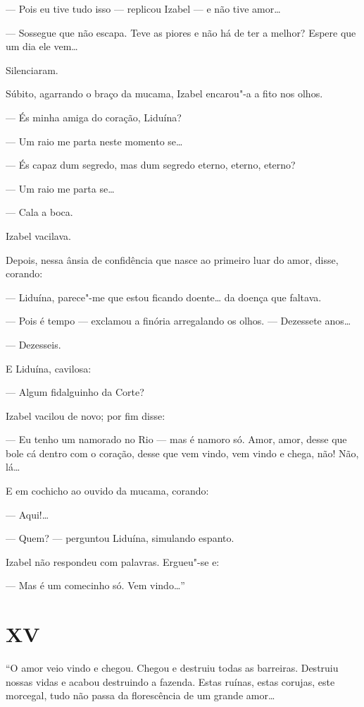 --- Pois eu tive tudo isso --- replicou Izabel --- e não tive amor\ldots{}

--- Sossegue que não escapa. Teve as piores e não há de ter a melhor?
Espere que um dia ele vem\ldots{}

Silenciaram.

Súbito, agarrando o braço da mucama, Izabel encarou"-a a fito nos olhos.

--- És minha amiga do coração, Liduína?

--- Um raio me parta neste momento se\ldots{}

--- És capaz dum segredo, mas dum segredo eterno, eterno, eterno?

--- Um raio me parta se\ldots{}

--- Cala a boca.

Izabel vacilava.

Depois, nessa ânsia de confidência que nasce ao primeiro luar do amor,
disse, corando:

--- Liduína, parece"-me que estou ficando doente\ldots{} da doença que
faltava.

--- Pois é tempo --- exclamou a finória arregalando os olhos. ---
Dezessete anos\ldots{}

--- Dezesseis.

E Liduína, cavilosa:

--- Algum fidalguinho da Corte?

Izabel vacilou de novo; por fim disse:

--- Eu tenho um namorado no Rio --- mas é namoro só. Amor, amor, desse
que bole cá dentro com o coração, desse que vem vindo, vem vindo e
chega, não! Não, lá\ldots{}

E em cochicho ao ouvido da mucama, corando:

--- Aqui!\ldots{}

--- Quem? --- perguntou Liduína, simulando espanto.

Izabel não respondeu com palavras. Ergueu"-se e:

--- Mas é um comecinho só. Vem vindo\ldots{}''

\section*{XV}

``O amor veio vindo e chegou. Chegou e destruiu todas as barreiras.
Destruiu nossas vidas e acabou destruindo a fazenda. Estas ruínas, estas
corujas, este morcegal, tudo não passa da florescência de um grande
amor\ldots{}

